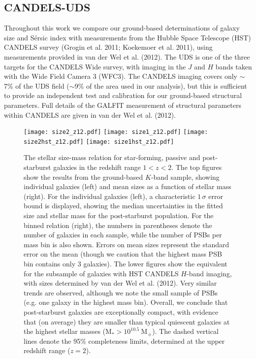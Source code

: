 \documentclass[a4paper,fleqn,usenatbib,useAMS]{mnras}
\begin{document}
\subsection{CANDELS-UDS}


Throughout this work we compare our ground-based determinations of
galaxy size and S\'{e}rsic index with measurements from the Hubble
Space Telescope (HST) CANDELS survey (Grogin et al. 2011; Koekemoer et
al. 2011), using measurements provided in van der Wel et al. (2012).
 The UDS is one of the three targets for the CANDELS Wide
survey, with imaging in the $J$ and $H$ bands taken with the Wide
Field Camera 3 (WFC3). The CANDELS imaging covers only $\sim$7\% of
the UDS field ($\sim$9\% of the area used in our analysis), but this
is sufficient to provide an independent test and calibration for our
ground-based structural parameters. Full details of the \textsc{GALFIT}
measurement of structural parameters within CANDELS are given in van
der Wel et al. (2012).




\begin{figure*}
	\texttt{[image: size2\_z12.pdf]}
	\texttt{[image: size1\_z12.pdf]}
	\texttt{[image: size2hst\_z12.pdf]}
	\texttt{[image: size1hst\_z12.pdf]}
    \caption{The stellar size-mass relation for star-forming, passive
      and post-starburst galaxies in the redshift range $1<z<2$.  The
      top figures show the results from the ground-based $K$-band
      sample, showing individual galaxies (left) and mean sizes as a
      function of stellar mass (right).  For the individual galaxies
      (left), a characteristic $1\,\sigma$ error bound is displayed,
      showing the median uncertainties in the fitted size and stellar
      mass for the post-starburst population.  For the binned relation
      (right), the numbers in parentheses denote the number of
      galaxies in each sample, while the number of PSBs per mass bin
      is also shown.  Errors on mean sizes represent the standard
      error on the mean (though we caution that the highest mass PSB
      bin contains only 3 galaxies). The lower figures show the
      equivalent for the subsample of galaxies with HST CANDELS
      $H$-band imaging, with sizes determined by van der Wel et
      al. (2012).  Very similar trends are observed, although we note
      the small sample of PSBs (e.g. one galaxy in the highest mass
      bin).  Overall, we conclude that post-starburst galaxies are
      exceptionally compact, with evidence that (on average) they are
      smaller than typical quiescent galaxies at the highest stellar
      masses (M$_{\ast}> 10^{10.5} ~$M$_{\sun}$).  The dashed vertical
      lines denote the 95\% completeness limits, determined at the
      upper redshift range ($z=2$).}
    \label{fig:size-mass}
\end{figure*}
\end{document}
